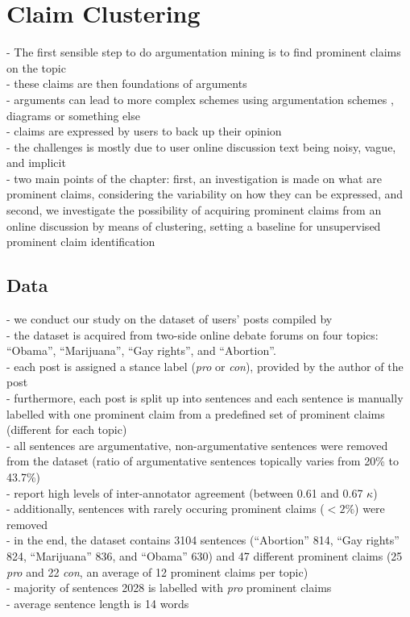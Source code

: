 \chapter{Claim Clustering}
\label{chap:argclu}

- The first sensible step to do argumentation mining is to find 
prominent claims on the topic \\
- these claims are then foundations of arguments \\
- arguments can lead to more complex schemes using argumentation schemes
\citep{walton2008argumentation}, diagrams
or something else \\
- claims are expressed by users to back up their opinion \\

- the challenges is mostly due to user online discussion text being noisy,
vague, and implicit \\
- two main points of the chapter: first, an investigation is made on what are
prominent claims, considering the variability on how they can be expressed, and
second, we investigate the possibility of acquiring prominent claims from an
online discussion by means of clustering, setting a baseline for unsupervised
prominent claim identification \\

\section{Data}

- we conduct our study on the dataset of users' posts compiled by \citet{hasan2014you} \\
- the dataset is acquired from two-side online debate forums on four topics: 
``Obama'', ``Marijuana'', ``Gay rights'', and ``Abortion''. \\
- each post is assigned a stance label (\textit{pro} or \textit{con}), provided
by the author of the post \\
- furthermore, each post is split up into sentences and each sentence is manually labelled
with one prominent claim from a predefined set of prominent claims 
(different for each topic) \\
- all sentences are argumentative, non-argumentative sentences were removed from the 
dataset (ratio of argumentative sentences topically varies from  20\% to 43.7\%) \\
- \citet{hasan2014you} report high levels of inter-annotator agreement (between
0.61 and 0.67 $\kappa$) \\
- additionally, sentences with rarely occuring prominent claims ($<2\%$) were removed \\
- in the end, the dataset contains 3104 sentences (``Abortion'' 814, ``Gay rights'' 824, 
``Marijuana'' 836, and ``Obama'' 630) and 47 different prominent claims 
(25 \textit{pro} and 22 \textit{con}, an average of 12 prominent claims per topic) \\
- majority of sentences 2028 is labelled with \textit{pro} prominent claims \\
- average sentence length is 14 words \\ 

